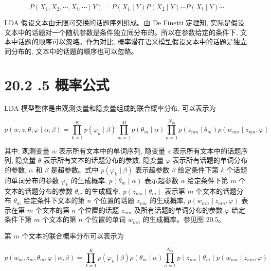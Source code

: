 \documentclass[10pt]{article}
\begin{document}
\begin{CJK*}{UTF8}{bsmi}
\begin{equation*}
P\left(X_{1}, X_{2}, \cdots, X_{i}, \cdots \mid Y\right)=P\left(X_{1} \mid Y\right) P\left(X_{2} \mid Y\right) \cdots P\left(X_{i} \mid Y\right) \cdots \tag{20.14}
\end{equation*}


LDA 假设文本由无限可交换的话题序列组成。由 De Finetti 定理知, 实际是假设文本中的话题对一个随机参数是条件独立同分布的。所以在参数给定的条件下, 文本中话题的顺序可以忽略。作为对比, 概率潜在语义模型假设文本中的话题是独立同分布的, 文本中的话题的顺序也可以忽略。

\section*{20.2 .5 概率公式}
LDA 模型整体是由观测变量和隐变量组成的联合概率分布, 可以表示为


\begin{equation*}
p(w, z, \theta, \varphi \mid \alpha, \beta)=\prod_{k=1}^{K} p\left(\varphi_{k} \mid \beta\right) \prod_{m=1}^{M} p\left(\theta_{m} \mid \alpha\right) \prod_{n=1}^{N_{m}} p\left(z_{m n} \mid \theta_{m}\right) p\left(w_{m n} \mid z_{m n}, \varphi\right) \tag{20.15}
\end{equation*}


其中, 观测变量 $w$ 表示所有文本中的单词序列, 隐变量 $z$ 表示所有文本中的话题序列, 隐变量 $\theta$ 表示所有文本的话题分布的参数, 隐变量 $\varphi$ 表示所有话题的单词分布的参数, $\alpha$ 和 $\beta$ 是超参数。式中 $p\left(\varphi_{k} \mid \beta\right)$ 表示超参数 $\beta$ 给定条件下第 $k$ 个话题的单词分布的参数 $\varphi_{k}$ 的生成概率, $p\left(\theta_{m} \mid \alpha\right)$ 表示超参数 $\alpha$ 给定条件下第 $m$ 个文本的话题分布的参数 $\theta_{m}$ 的生成概率, $p\left(z_{m n} \mid \theta_{m}\right)$ 表示第 $m$ 个文本的话题分布 $\theta_{m}$ 给定条件下文本的第 $n$ 个位置的话题 $z_{m n}$ 的生成概率, $p\left(w_{m n} \mid z_{m n}, \varphi\right)$ 表示在第 $m$ 个文本的第 $n$ 个位置的话题 $z_{m n}$ 及所有话题的单词分布的参数 $\varphi$ 给定条件下第 $m$ 个文本的第 $n$ 个位置的单词 $w_{m n}$ 的生成概率。参见图 20.5。

第 $m$ 个文本的联合概率分布可以表示为


\begin{equation*}
p\left(w_{m}, z_{m}, \theta_{m}, \varphi \mid \alpha, \beta\right)=\prod_{k=1}^{K} p\left(\varphi_{k} \mid \beta\right) p\left(\theta_{m} \mid \alpha\right) \prod_{n=1}^{N_{m}} p\left(z_{m n} \mid \theta_{m}\right) p\left(w_{m n} \mid z_{m n}, \varphi\right) \tag{20.16}
\end{equation*}



\end{CJK*}
\end{document}
